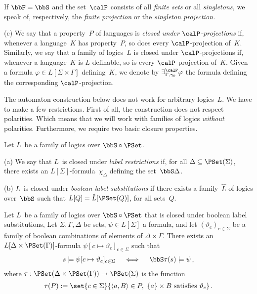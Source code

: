 \documentclass[10pt, fleqn]{scrartcl}
\newcommand*{\?}{\kern .08em}
\begin{document}
\begin{Def}
If $\bbF = \bbS$ and the set~$\calP$ consists of all
\emph{finite sets} or all \emph{singletons,} we speak of, respectively, the
\emph{finite projection} or the \emph{singleton projection.}

(c) We say that a property~$P$ of languages is \emph{closed under $\calP$-projections}
if, whenever a language~$K$ has property~$P$, so does every $\calP$-projection of~$K$.
Similarly, we say that a family of logics~$L$ is closed under $\calP$-projections if,
whenever a language~$K$ is $L$-definable, so is every $\calP$-projection of~$K$.
Given a formula $\varphi \in L[\Sigma \times \Gamma]$ defining~$K$,
we denote by $\exists^\calP_{\Gamma,\gamma_0}\varphi$
the formula defining the corresponding $\calP$-projection.
\end{Def}

The automaton construction below does not work for arbitrary logics~$L$.
We have to make a few restrictions. First of all, the construction does not respect polarities.
Which means that we will work with families of logics \emph{without} polarities.
Furthermore, we require two basic closure properties.
\begin{Def}
Let $L$~be a family of logics over $\bbS\circ\PSet$.

(a)
We say that $L$~is closed under \emph{label restrictions} if,
for all $\Delta \subseteq \PSet(\Sigma)$,
there exists an $L[\Sigma]$-formula~$\chi_\Delta$ defining the set~$\bbS\Delta$.

(b)
$L$~is closed under \emph{boolean label substitutions}
if there exists a family~$\hat L$ of logics over~$\bbS$ such that
$L[Q] = \hat L[\PSet(Q)]$, for all sets~$Q$.
\end{Def}
\begin{Lem}\label{Lem: boolean substitutions}
Let $L$~be a family of logics over $\bbS \circ \PSet$ that is closed under boolean
label substitutions, Let $\Sigma,\Gamma,\Delta$ be sets, $\psi \in L[\Sigma]$ a formula,
and let $(\vartheta_c)_{c \in \Sigma}$ be a family of boolean combinations of elements of
$\Delta \times \Gamma$. There exists an $L[\Delta \times \PSet(\Gamma)]$-formula
$\psi[c \mapsto \vartheta_c]_{c \in \Sigma}$ such that
\begin{align*}
  s \models \psi[c \mapsto \vartheta_c]_{c \in \Sigma}
  \quad\iff\quad
  \bbS\tau(s) \models \psi\,,
\end{align*}
where $\tau : \PSet(\Delta \times \PSet(\Gamma)) \to \PSet(\Sigma)$ is the function
\begin{align*}
  \tau(P) := \set{ c \in \Sigma }
                 { \langle a,B\rangle \in P,\ \{a\} \times B \text{ satisfies } \vartheta_c }\,.
\end{align*}
\end{Lem}
\end{document}
